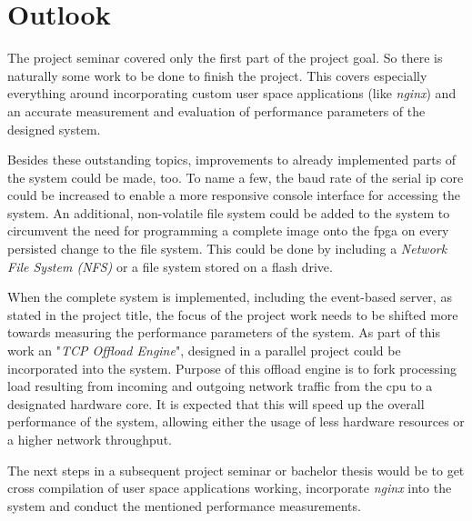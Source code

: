 \section{Outlook}

The project seminar covered only the first part of the project goal. So there is naturally some work to be done to finish the project. This covers especially everything around incorporating custom user space applications (like \textit{nginx}) and an accurate measurement and evaluation of performance parameters of the designed system.

Besides these outstanding topics, improvements to already implemented parts of the system could be made, too. To name a few, the baud rate of the serial \gls{ip} core could be increased to enable a more responsive console interface for accessing the system. An additional, non-volatile file system could be added to the system to circumvent the need for programming a complete image onto the \gls{fpga} on every persisted change to the file system. This could be done by including a \textit{Network File System (NFS)} or a file system stored on a flash drive.

When the complete system is implemented, including the event-based server, as stated in the project title, the focus of the project work needs to be shifted more towards measuring the performance parameters of the system. As part of this work an "\textit{TCP Offload Engine}", designed in a parallel project could be incorporated into the system. Purpose of this offload engine is to fork processing load resulting from incoming and outgoing network traffic from the \gls{cpu} to a designated hardware core. It is expected that this will speed up the overall performance of the system, allowing either the usage of less hardware resources or a higher network throughput.

The next steps in a subsequent project seminar or bachelor thesis would be to get  cross compilation of user space applications working, incorporate \textit{nginx} into the system and conduct the mentioned performance measurements.